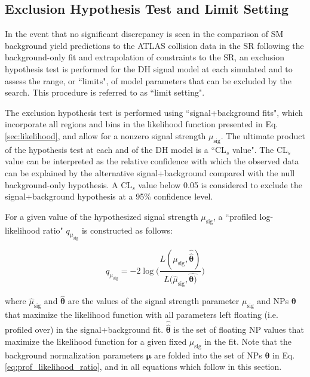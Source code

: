 \subsection{Exclusion Hypothesis Test and Limit Setting}
\label{sec:hypo_test}

In the event that no significant discrepancy is seen in the comparison of SM background yield predictions to the ATLAS collision data in the SR following the background-only fit and extrapolation of constraints to the SR, an exclusion hypothesis test is performed for the DH signal model at each simulated \ms and \mZp to assess the range, or ``limits", of model parameters that can be excluded by the search. This procedure is referred to as ``limit setting".

The exclusion hypothesis test is performed using ``signal+background fits", which incorporate all regions and bins in the likelihood function presented in Eq. \ref{sec:likelihood}, and allow for a nonzero signal strength \(\mu_\text{sig}\). The ultimate product of the hypothesis test at each \ms and \mZp of the DH model is a ``CL\(_s\) value". The CL\(_s\) value can be interpreted as the relative confidence with which the observed data can be explained by the alternative signal+background compared with the null background-only hypothesis. A CL\(_s\) value below 0.05 is considered to exclude the signal+background hypothesis at a 95\% confidence level.

For a given value of the hypothesized signal strength \(\mu_\text{sig}\), a ``profiled log-likelihood ratio" \(q_{\mu_\text{sig}}\) is constructed as follows:

\begin{equation}
\label{eq:prof_likelihood_ratio}
q_{\mu_\text{sig}} = -2\log\Bigg( \frac{L(\mu_\text{sig}, \hat{\hat{\boldsymbol{\theta}}})}{L(\hat{\mu}_\text{sig}, \hat{\boldsymbol{\theta})}} \Bigg)
\end{equation}

\noindent where \(\hat{\mu}_\text{sig}\) and \(\hat{\boldsymbol{\theta}}\) are the values of the signal strength parameter \(\mu_\text{sig}\) and NPs \(\boldsymbol{\theta}\) that maximize the likelihood function with all parameters left floating (i.e. profiled over) in the signal+background fit. \(\hat{\hat{\boldsymbol{\theta}}}\) is the set of floating NP values that maximize the likelihood function for a given fixed \(\mu_\text{sig}\) in the fit. Note that the background normalization parameters \(\boldsymbol{\mu}\) are folded into the set of NPs \(\boldsymbol{\theta}\) in Eq. 
\ref{eq:prof_likelihood_ratio}, and in all equations which follow in this section.


